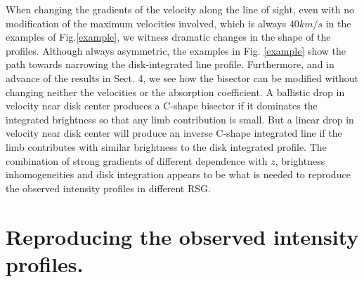 \documentclass{/Users/art2/TeX/aanda/aa}
\begin{document}
When changing the gradients of the velocity along the line of sight, even with no modification of the maximum velocities involved, which is 
always $40km/s$ in the examples of Fig.\ref{example}, we witness dramatic changes in the shape of the profiles. Although always asymmetric, the 
examples 
in Fig. \ref{example} show the path towards narrowing the disk-integrated line profile. Furthermore, and in advance of the results in Sect. 4, we see how the bisector can be modified without 
changing neither the velocities or the absorption 
coefficient. A ballistic drop in velocity near disk center produces a C-shape bisector if it dominates the integrated brightness so that any limb 
contribution is 
small. But a linear drop in velocity near disk center will produce an inverse C-shape integrated line if the limb contributes with similar brightness 
to the 
disk integrated profile. The combination of strong gradients of different dependence with $z$, brightness inhomogeneities and disk integration 
appears to be what is needed to reproduce the observed intensity profiles in different RSG.

\section{Reproducing the observed intensity profiles.}
\end{document}
